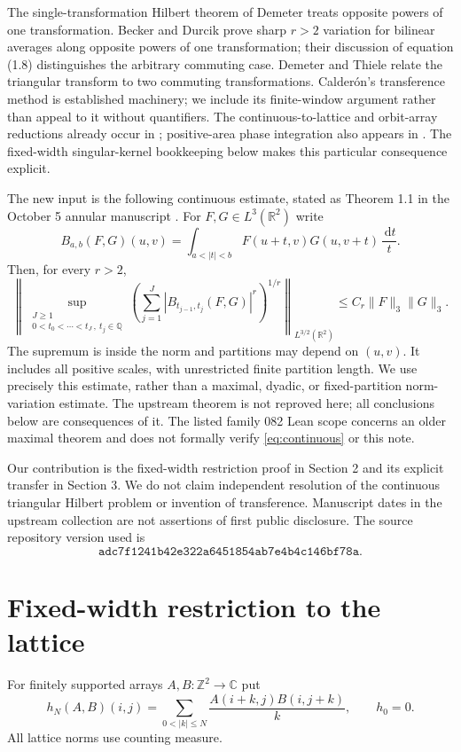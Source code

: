 \documentclass[11pt]{article}
\newcommand{\Z}{\mathbb Z}
\newcommand{\R}{\mathbb R}
\newcommand{\dd}{\,\mathrm d}
\begin{document}
The single-transformation Hilbert theorem of Demeter
\cite[Theorem 1.2]{Demeter} treats opposite powers of one
transformation. Becker and Durcik \cite[Corollary 1.4]{BD} prove sharp
$r>2$ variation for bilinear averages along opposite powers of one
transformation; their discussion of equation (1.8) distinguishes the
arbitrary commuting case. Demeter and Thiele \cite[Section 6]{DT}
relate the triangular transform to two commuting transformations.
Calder\'on's transference method \cite{Calderon} is established machinery;
we include its finite-window argument rather than appeal to it without
quantifiers.
The continuous-to-lattice and orbit-array reductions already occur in
\cite[Section 6, footnote 36]{DT}; positive-area phase integration also
appears in \cite[Section 5]{DKST}. The fixed-width singular-kernel
bookkeeping below makes this particular consequence explicit.

The new input is the following continuous estimate, stated as
Theorem 1.1 in the October 5 annular manuscript \cite{OAI}. For
$F,G\in L^3(\R^2)$ write
\[
 B_{a,b}(F,G)(u,v)=\int_{a<|t|<b}F(u+t,v)G(u,v+t)\,\frac{\dd t}{t}.
\]
Then, for every $r>2$,
\begin{equation}\label{eq:continuous}
 \left\|\sup_{\substack{J\ge1\\0<t_0<\cdots<t_J\,,\ t_j\in\mathbb Q}}
       \left(\sum_{j=1}^J|B_{t_{j-1},t_j}(F,G)|^r\right)^{1/r}
       \right\|_{L^{3/2}(\R^2)}
 \le C_r\|F\|_3\|G\|_3.
\end{equation}
The supremum is inside the norm and partitions may depend on $(u,v)$.
It includes all positive scales, with unrestricted finite partition
length. We use precisely this estimate, rather than a maximal, dyadic,
or fixed-partition norm-variation estimate. The upstream theorem is
not reproved here; all conclusions below are consequences of it.
The listed family 082 Lean scope concerns an older maximal theorem
and does not formally verify \eqref{eq:continuous} or this note.

Our contribution is the fixed-width restriction proof in Section 2
and its explicit transfer in Section 3. We do not claim independent
resolution of the continuous triangular Hilbert problem or invention
of transference. Manuscript dates in the upstream collection are not
assertions of first public disclosure. The source repository version used is
\[
\texttt{adc7f1241b42e322a6451854ab7e4b4c146bf78a}.
\]

\section{Fixed-width restriction to the lattice}
For finitely supported arrays $A,B:\Z^2\to\mathbb C$ put
\[
 h_N(A,B)(i,j)=\sum_{0<|k|\le N}\frac{A(i+k,j)B(i,j+k)}k,
 \qquad h_0=0.
\]
All lattice norms use counting measure.
\end{document}
